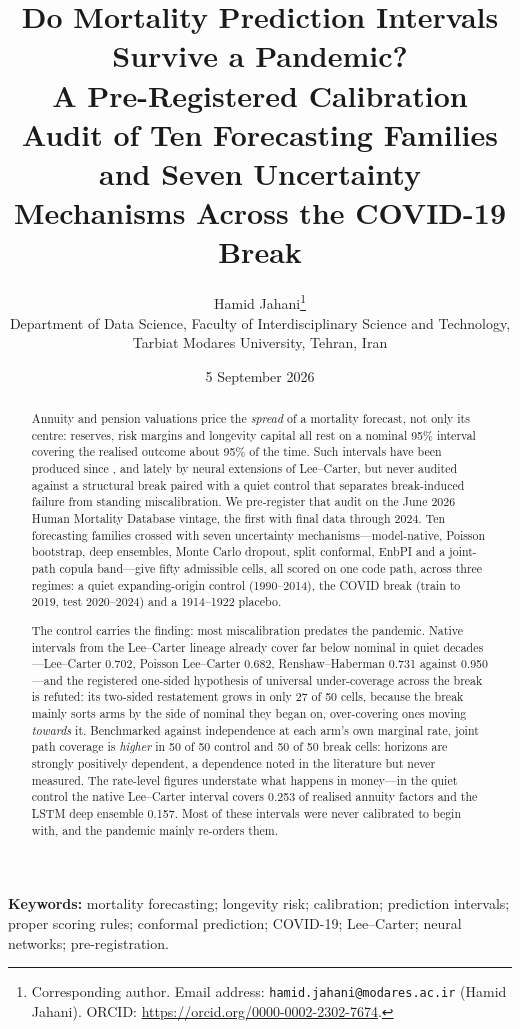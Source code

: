 \documentclass[11pt,a4paper]{article}
\title{Do Mortality Prediction Intervals Survive a Pandemic?\\[0.4em]
  \large A Pre-Registered Calibration Audit of Ten Forecasting Families and
  Seven Uncertainty Mechanisms Across the COVID-19 Break}
\author{%
  Hamid Jahani\thanks{Corresponding author.
    Email address: \texttt{hamid.jahani@modares.ac.ir} (Hamid Jahani).
    ORCID: \url{https://orcid.org/0000-0002-2302-7674}.}\\[0.45em]
  \normalsize Department of Data Science, Faculty of Interdisciplinary Science and Technology,\\
  \normalsize Tarbiat Modares University, Tehran, Iran}
\date{5 September 2026}
\theoremstyle{definition}
\begin{document}
\maketitle

\begin{abstract}
Annuity and pension valuations price the \emph{spread} of a mortality
forecast, not only its centre: reserves, risk margins and longevity capital
all rest on a nominal 95\% interval covering the realised outcome about 95\%
of the time. Such intervals have been produced since \citet{lee1992modeling},
and lately by neural extensions of Lee--Carter, but never audited against a
structural break paired with a quiet control that separates break-induced
failure from standing miscalibration. We pre-register that audit on the June
2026 Human Mortality Database vintage, the first with final data through
2024. Ten forecasting families crossed with seven uncertainty
mechanisms---model-native, Poisson bootstrap, deep ensembles, Monte Carlo
dropout, split conformal, EnbPI and a joint-path copula band---give fifty
admissible cells, all scored on one code path, across three regimes: a quiet
expanding-origin control (1990--2014), the COVID break (train to 2019, test
2020--2024) and a 1914--1922 placebo.

The control carries the finding: most miscalibration predates the pandemic.
Native intervals from the Lee--Carter lineage already cover far below
nominal in quiet decades---Lee--Carter 0.702, Poisson Lee--Carter 0.682,
Renshaw--Haberman 0.731 against 0.950---and the registered one-sided
hypothesis of universal under-coverage across the break is refuted: its
two-sided restatement grows in only 27 of 50 cells, because the break mainly
sorts arms by the side of nominal they began on, over-covering ones moving
\emph{towards} it. Benchmarked against independence at each arm's own
marginal rate, joint path coverage is \emph{higher} in 50 of 50 control and
50 of 50 break cells: horizons are strongly positively dependent, a
dependence noted in the literature but never measured. The rate-level
figures understate what happens in money---in the quiet control the native
Lee--Carter interval covers 0.253 of realised annuity factors and the LSTM
deep ensemble 0.157. Most of these intervals were never calibrated to begin
with, and the pandemic mainly re-orders them.
\end{abstract}

\noindent\textbf{Keywords:} mortality forecasting; longevity risk;
calibration; prediction intervals; proper scoring rules; conformal
prediction; COVID-19; Lee--Carter; neural networks; pre-registration.
\end{document}

